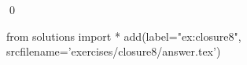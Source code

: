 
\begin{ex} 
  \label{ex:closure8}
  
  \qed
\end{ex} 
\begin{python0}
from solutions import *
add(label="ex:closure8",
    srcfilename='exercises/closure8/answer.tex') 
\end{python0}
